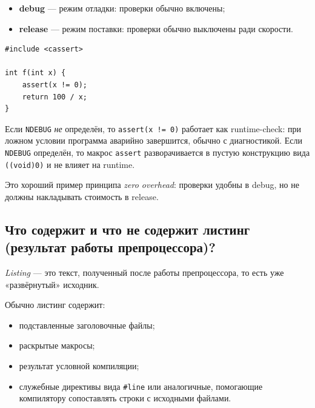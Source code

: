 \begin{definition}
\begin{itemize}
    \item \textbf{debug} — режим отладки: проверки обычно включены;
    \item \textbf{release} — режим поставки: проверки обычно выключены ради скорости.
\end{itemize}
\end{definition}

\begin{example}
\begin{verbatim}
#include <cassert>

int f(int x) {
    assert(x != 0);
    return 100 / x;
}
\end{verbatim}
\end{example}

Если \texttt{NDEBUG} \emph{не} определён, то \texttt{assert(x != 0)} работает как runtime-check: при ложном условии программа аварийно завершится, обычно с диагностикой.  
Если \texttt{NDEBUG} определён, то макрос \texttt{assert} разворачивается в пустую конструкцию вида \texttt{((void)0)} и не влияет на runtime.

\begin{remark}
Это хороший пример принципа \textit{zero overhead}: проверки удобны в debug, но не должны накладывать стоимость в release.
\end{remark}

\subsection{Что содержит и что не содержит листинг (результат работы препроцессора)?}
\begin{definition}[Листинг]
\textit{Listing} — это текст, полученный после работы препроцессора, то есть уже «развёрнутый» исходник.
\end{definition}

Обычно листинг содержит:
\begin{itemize}
    \item подставленные заголовочные файлы;
    \item раскрытые макросы;
    \item результат условной компиляции;
    \item служебные директивы вида \texttt{\#line} или аналогичные, помогающие компилятору сопоставлять строки с исходными файлами.
\end{itemize}

